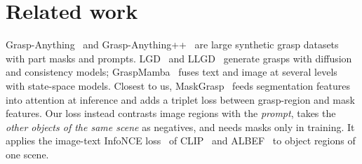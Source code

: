\section{Related work}
\label{sec:related}

Grasp-Anything~\cite{vuong2023grasp} and Grasp-Anything++~\cite{vuong2024language} are large synthetic grasp datasets with part masks and prompts.
LGD~\cite{vuong2024language} and LLGD~\cite{nguyen2024lightweight} generate grasps with diffusion and consistency models; GraspMamba~\cite{nguyen2024graspmamba} fuses text and image at several levels with state-space models.
Closest to us, MaskGrasp~\cite{vo2024maskgrasp} feeds segmentation features into attention at inference and adds a triplet loss between grasp-region and mask features.
Our loss instead contrasts image regions with the \emph{prompt}, takes the \emph{other objects of the same scene} as negatives, and needs masks only in training.
It applies the image-text InfoNCE loss~\cite{oord2018cpc} of CLIP~\cite{radford2021clip} and ALBEF~\cite{li2021albef} to object regions of one scene.
